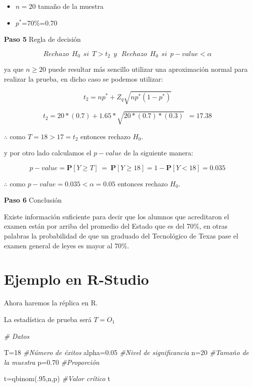\documentclass[
  a4paper,
  oneside,
  openany]{book}
\newenvironment{Shaded}{\begin{snugshade}}{\end{snugshade}}
\newcommand{\CommentTok}[1]{\textcolor[rgb]{0.56,0.35,0.01}{\textit{#1}}}
\newcommand{\DecValTok}[1]{\textcolor[rgb]{0.00,0.00,0.81}{#1}}
\newcommand{\FloatTok}[1]{\textcolor[rgb]{0.00,0.00,0.81}{#1}}
\newcommand{\FunctionTok}[1]{\textcolor[rgb]{0.00,0.00,0.00}{#1}}
\newcommand{\NormalTok}[1]{#1}
\newcommand{\OtherTok}[1]{\textcolor[rgb]{0.56,0.35,0.01}{#1}}
\begin{document}
\begin{itemize}
\item
  \(n=20\) tamaño de la muestra
\item
  \(p^*\)=70\%=0.70
\end{itemize}

\textbf{Paso 5} Regla de decisión

\[Rechazo \ \  H_0 \ \  si \ \ T>t_{2} \ \  y \ \ \  Rechazo \ \  H_0 \ \ si \ \  p-value<\alpha\]

ya que \(n \geq 20\) puede resultar más sencillo utilizar una aproximación normal para realizar la prueba, en dicho caso se podemos utilizar:

\[t_{2}=np^*+Z_{q}\sqrt{np^*(1-p^*)}\]

\[t_{2}=20*(0.7)+1.65*\sqrt{20*(0.7)*(0.3)} \ \ = 17.38\]

\(\therefore\) como \(T=18>17=t_{2}\) entonces rechazo \(H_0\).

y por otro lado calculamos el \(p-value\) de la siguiente manera:

\[p-value= \mathbf{P}[Y \geq T] \  = \ \mathbf{P}[Y \geq 18]=1-\mathbf{P}[Y < 18]= 0.035\]

\(\therefore\) como \(p-value=0.035<\alpha=0.05\) entonces rechazo \(H_0\).

\textbf{Paso 6} Conclusión

Existe información suficiente para decir que los alumnos que acreditaron el examen están por arriba del promedio del Estado que es del 70\%, en otras palabras la probabilidad de que un graduado del Tecnológico de Texas pase el examen general de leyes es mayor al 70\%.

\hypertarget{ejemplo-en-r-studio}{%
\section{Ejemplo en R-Studio}\label{ejemplo-en-r-studio}}

Ahora haremos la réplica en R.

La estadística de prueba será \(T=O_1\)

\begin{Shaded}
\begin{Highlighting}[]
\CommentTok{\# Datos}

\NormalTok{T}\OtherTok{=}\DecValTok{18}                                   \CommentTok{\#Número de éxitos}
\NormalTok{alpha}\OtherTok{=}\FloatTok{0.05}                             \CommentTok{\#Nivel de significancia}
\NormalTok{n}\OtherTok{=}\DecValTok{20}                                   \CommentTok{\#Tamaño de la muestra}
\NormalTok{p}\OtherTok{=}\FloatTok{0.70}                                 \CommentTok{\#Proporción  }

\NormalTok{t}\OtherTok{=}\FunctionTok{qbinom}\NormalTok{(.}\DecValTok{95}\NormalTok{,n,p)                       }\CommentTok{\#Valor crítico}
\NormalTok{t}
\end{Highlighting}
\end{Shaded}
\end{document}
